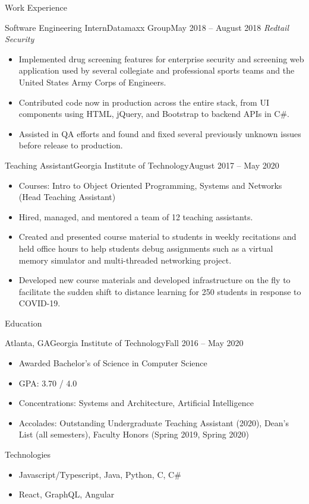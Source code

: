\documentclass[]{mcdowellcv}
\begin{document}
\begin{cvsection}{Work Experience}
				\begin{cvsubsection}{Software Engineering Intern}{Datamaxx Group}{May 2018 -- August 2018}		
		\emph{Redtail Security}
			\begin{itemize}
				\item Implemented drug screening features for enterprise security and screening web application used by several collegiate and professional sports teams and the United States Army Corps of Engineers.
				\item Contributed code now in production across the entire stack, from UI components using HTML, jQuery, and Bootstrap to backend APIs in C\#.
				\item Assisted in QA efforts and found and fixed several previously unknown issues before release to production.
			\end{itemize}
		\end{cvsubsection}
		
		\begin{cvsubsection}{Teaching Assistant}{Georgia Institute of Technology}{August 2017 -- May 2020}
			\begin{itemize}
				\item Courses: Intro to Object Oriented Programming, Systems and Networks (Head Teaching Assistant)
				\item Hired, managed, and mentored a team of 12 teaching assistants.
				\item Created and presented course material to students in weekly recitations and held office hours to help students debug assignments such as a virtual memory simulator and multi-threaded networking project.
				\item Developed new course materials and developed infrastructure on the fly to facilitate the sudden shift to distance learning for 250 students in response to COVID-19.
			\end{itemize}
		\end{cvsubsection}
	\end{cvsection}
	
		\begin{cvsection}{Education}
		\begin{cvsubsection}{Atlanta, GA}{Georgia Institute of Technology}{Fall 2016 -- May 2020}
			\begin{itemize}
				\item Awarded Bachelor's of Science in Computer Science
				\item GPA: 3.70 / 4.0
				\item Concentrations: Systems and Architecture, Artificial Intelligence
				\item Accolades: Outstanding Undergraduate Teaching Assistant (2020), Dean's List (all semesters), Faculty Honors (Spring 2019, Spring 2020)
			\end{itemize}
		\end{cvsubsection}
	\end{cvsection}
	
	\begin{cvsection}{Technologies}
		\begin{cvsubsection}{}{}{}	
			\begin{itemize}
				\item Javascript/Typescript, Java, Python, C, C\#
				\item React, GraphQL, Angular
			\end{itemize}
		\end{cvsubsection}
	\end{cvsection}
	
\end{document}
